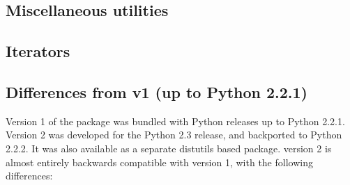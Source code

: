 \subsection{Miscellaneous utilities}


\subsection{Iterators}


\subsection{Differences from  v1 (up to Python 2.2.1)}

Version 1 of the  package was bundled with Python
releases up to Python 2.2.1.  Version 2 was developed for the Python
2.3 release, and backported to Python 2.2.2.  It was also available as
a separate distutils based package.   version 2 is
almost entirely backwards compatible with version 1, with the
following differences:

